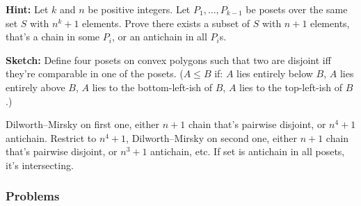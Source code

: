 \documentclass[11pt,paper=letter]{scrartcl}
\begin{document}
\begin{enumerate}
\textbf{Hint:} Let $k$ and $n$ be positive integers. Let $P_1, \ldots, P_{k-1}$ be posets over the same set $S$ with $n^k + 1$ elements. Prove there exists a subset of $S$ with $n + 1$ elements, that's a chain in some $P_i$, or an antichain in all $P_i$s.

\textbf{Sketch:} Define four posets on convex polygons such that two are disjoint iff they're comparable in one of the posets. ($A \le B$ if: $A$ lies entirely below $B$, $A$ lies entirely above $B$, $A$ lies to the bottom-left-ish of $B$, $A$ lies to the top-left-ish of $B$.)

Dilworth--Mirsky on first one, either $n + 1$ chain that's pairwise disjoint, or $n^4 + 1$ antichain. Restrict to $n^4 + 1$, Dilworth--Mirsky on second one, either $n + 1$ chain that's pairwise disjoint, or $n^3 + 1$ antichain, etc. If set is antichain in all posets, it's intersecting.

\end{enumerate}

\subsubsection*{Problems}
\end{document}
